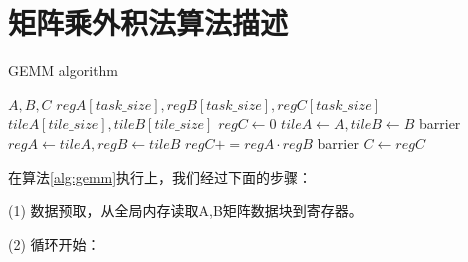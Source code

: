 \section{矩阵乘外积法算法描述}


\begin{algorithm}[htbp]
	\small
	\caption{GEMM algorithm}\label{alg:gemm}
	\begin{algorithmic}[1]
		\State $A, B, C$
		\State $regA[task\_size],regB[task\_size],regC[task\_size]$
		\State $tileA[tile\_size],tileB[tile\_size]$
		\State $regC \gets 0$
        \State $tileA \gets A, tileB \gets B $
        \State barrier
        \State $regA \gets tileA, regB \gets tileB$
        \State $regC += regA \cdot regB$
        \EndFor
        \State barrier
		\EndWhile\label{gemmendwhile}
		\State $C \gets regC$
	\end{algorithmic}
\end{algorithm}

在算法\ref{alg:gemm}执行上，我们经过下面的步骤：

(1)	数据预取，从全局内存读取A,B矩阵数据块到寄存器。

(2) 循环开始：

